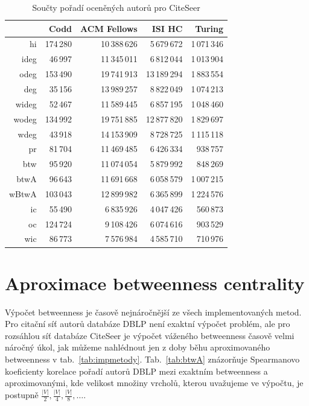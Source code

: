 \documentclass{bakalarka}
\begin{document}
\begin{table}[!ht]
\centering
\caption{Součty pořadí oceněných autorů pro CiteSeer}
\label{tab:oceneni2}
\begin{tabular}{r|rrrr}
\toprule
&Codd & ACM Fellows & ISI HC  & Turing \\
\midrule
hi   &174\,280&10\,388\,626& 5\,679\,672&1\,071\,346 \\
ideg & 46\,997&11\,345\,011& 6\,812\,044&1\,013\,904 \\
odeg &153\,490&19\,741\,913&13\,189\,294&1\,883\,554 \\
deg  & 35\,156&13\,989\,257& 8\,822\,049&1\,074\,213 \\
wideg& 52\,467&11\,589\,445& 6\,857\,195&1\,048\,460 \\
wodeg&134\,992&19\,751\,885&12\,877\,820&1\,829\,697\\
wdeg & 43\,918&14\,153\,909& 8\,728\,725&1\,115\,118\\
pr   & 81\,704&11\,469\,485& 6\,426\,334&   938\,757\\
btw  & 95\,920&11\,074\,054& 5\,879\,992&   848\,269\\
btwA & 96\,643&11\,691\,668& 6\,058\,579&1\,007\,215\\
wBtwA&103\,043&12\,899\,982& 6\,365\,899&1\,224\,576\\
\midrule
ic\footnotemark[1]  &55\,490 &6\,835\,926&4\,047\,426&560\,873\\
oc\footnotemark[1]  &124\,724&9\,108\,426&6\,074\,616&903\,529\\
wic\footnotemark[1] &86\,773 &7\,576\,984&4\,585\,710&710\,976\\
\bottomrule
\end{tabular}
\end{table}


\section{Aproximace betweenness centrality}
Výpočet betweenness je časově nejnáročnější ze všech implementovaných metod.
Pro citační síť autorů databáze DBLP není exaktní výpočet problém, ale pro
rozsáhlou síť databáze CiteSeer je výpočet váženého betweenness časově velmi
náročný úkol, jak můžeme nahlédnout jen z doby běhu aproximovaného betweenness
v tab.~\ref{tab:impmetody}. Tab.~\ref{tab:btwA} znázorňuje Spearmanovo
koeficienty korelace pořadí autorů DBLP mezi exaktním betweenness a
aproximovanými, kde velikost množiny vrcholů, kterou uvažujeme ve výpočtu, je
postupně $\frac{|V|}{2}, \frac{|V|}{4}, \frac{|V|}{8}, \ldots$.
\end{document}
